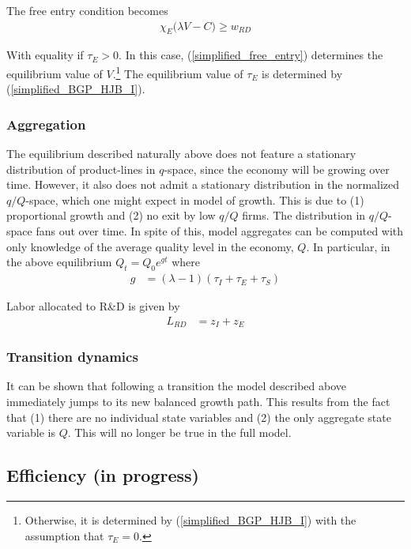 \documentclass[11pt,english]{article}
\theoremstyle{remark}
\begin{document}
The free entry condition becomes
\begin{align}
\chi_E \Big( \lambda V -  C \Big) \ge w_{RD} \label{simplified_free_entry}
\end{align}

With equality if $\tau_E > 0$. In this case, (\ref{simplified_free_entry}) determines the equilibrium value of $V$.\footnote{Otherwise, it is determined by (\ref{simplified_BGP_HJB_I}) with the assumption that $\tau_E = 0$.} The equilibrium value of $\tau_E$ is determined by (\ref{simplified_BGP_HJB_I}).

\subsubsection{Aggregation}

The equilibrium described naturally above does not feature a stationary distribution of product-lines in $q$-space, since the economy will be growing over time. However, it also does not admit a stationary distribution in the normalized $q/Q$-space, which one might expect in model of growth. This is due to (1) proportional growth and (2) no exit by low $q/Q$ firms. The distribution in $q/Q$-space fans out over time. In spite of this, model aggregates can be computed with only knowledge of the average quality level in the economy, $Q$. In particular, in the above equilibrium $Q_t = Q_0 e^{gt}$ where 
\begin{align}
g &= (\lambda -1) (\tau_I + \tau_E + \tau_S) \label{simplified_growth_aggregation}
\end{align} 

Labor allocated to R\&D is given by
\begin{align} 
L_{RD} &= z_I + z_E \label{simplified_RDlabor_aggregation}
\end{align}



\subsubsection{Transition dynamics}

It can be shown that following a transition the model described above immediately jumps to its new balanced growth path. This results from the fact that (1) there are no individual state variables and (2) the only aggregate state variable is $Q$. This will no longer be true in the full model.

\subsection{Efficiency (in progress)}
\end{document}
